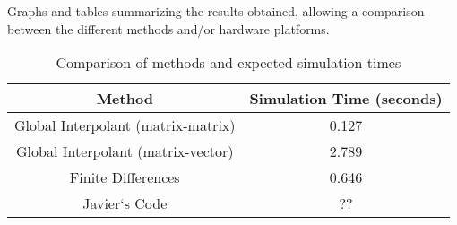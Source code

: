  Graphs and tables summarizing the results obtained, allowing a comparison between the different methods and/or hardware platforms.






\begin{table}[h!]
\centering
\begin{tabular}{|c|c|}
\hline
\textbf{Method} & \textbf{Simulation Time (seconds)} \\ \hline
Global Interpolant (matrix-matrix) &  0.127 \\ \hline
Global Interpolant (matrix-vector) &  2.789   \\ \hline
Finite Differences & 0.646 \\ \hline
Javier`s Code & ?? \\ \hline
\end{tabular}
\caption{Comparison of methods and expected simulation times}
\label{table:methods_time}
\end{table}







